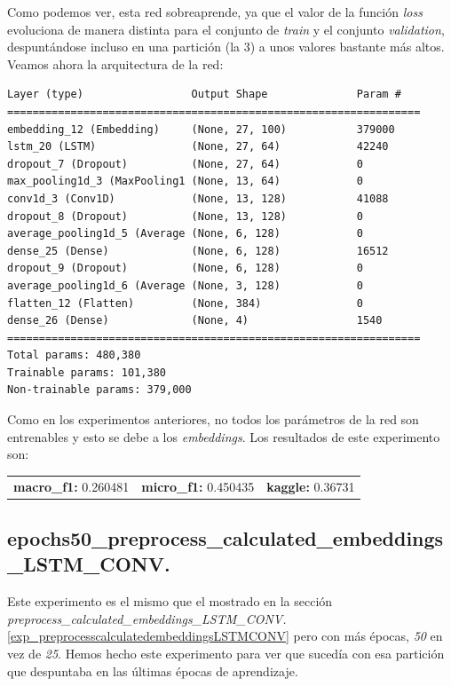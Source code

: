 \documentclass[11pt]{article}
\begin{document}
Como podemos ver, esta red sobreaprende, ya que el valor de la función \textit{loss} evoluciona de manera distinta para el conjunto de \textit{train} y el conjunto \textit{validation}, despuntándose incluso en una partición (la 3) a unos valores bastante más altos. Veamos ahora la arquitectura de la red:

\begin{verbatim}
Layer (type)                 Output Shape              Param #   
=================================================================
embedding_12 (Embedding)     (None, 27, 100)           379000    
lstm_20 (LSTM)               (None, 27, 64)            42240     
dropout_7 (Dropout)          (None, 27, 64)            0         
max_pooling1d_3 (MaxPooling1 (None, 13, 64)            0         
conv1d_3 (Conv1D)            (None, 13, 128)           41088     
dropout_8 (Dropout)          (None, 13, 128)           0         
average_pooling1d_5 (Average (None, 6, 128)            0         
dense_25 (Dense)             (None, 6, 128)            16512     
dropout_9 (Dropout)          (None, 6, 128)            0         
average_pooling1d_6 (Average (None, 3, 128)            0         
flatten_12 (Flatten)         (None, 384)               0         
dense_26 (Dense)             (None, 4)                 1540      
=================================================================
Total params: 480,380
Trainable params: 101,380
Non-trainable params: 379,000
\end{verbatim}

Como en los experimentos anteriores, no todos los parámetros de la red son entrenables y esto se debe a los \textit{embeddings}. Los resultados de este experimento son: 

\begin{table}[H]
\begin{tabular}{c|c|c}
\textbf{macro\_f1:} 0.260481 & \textbf{micro\_f1:} 0.450435 & \textbf{kaggle:} 0.36731
\end{tabular}
\end{table}

\subsection{epochs50\_preprocess\_calculated\_embeddings\_LSTM\_CONV.} \label{exp_epochs50preprocesscalculatedembeddingsLSTMCONV}

Este experimento es el mismo que el mostrado en la sección \textit{preprocess\_calculated\_embeddings\_LSTM\_CONV.} \ref{exp_preprocesscalculatedembeddingsLSTMCONV} pero con más épocas, \textit{50} en vez de \textit{25}. Hemos hecho este experimento para ver que sucedía con esa partición que despuntaba en las últimas épocas de aprendizaje.
\end{document}
